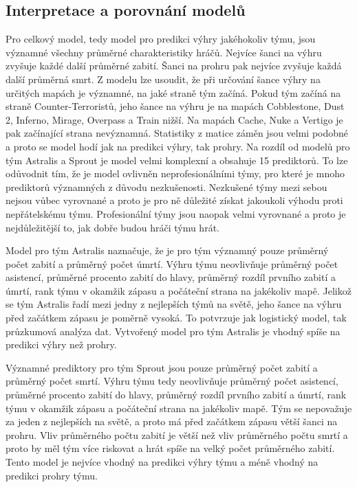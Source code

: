 \subsection{Interpretace a porovnání modelů}
Pro celkový model, tedy model pro predikci výhry jakéhokoliv týmu, jsou významné všechny průměrné charakteristiky hráčů. Nejvíce šanci na výhru zvyšuje každé
další průměrné zabití. Šanci na prohru pak nejvíce zvyšuje každá další průměrná smrt. Z modelu lze usoudit, že při určování šance výhry na určitých mapách je významné, na jaké 
straně tým začíná. Pokud tým začíná na straně Counter-Terroristů, jeho šance na výhru je na mapách Cobblestone, Dust 2,
Inferno, Mirage, Overpass a Train nižší. Na mapách Cache, Nuke a Vertigo je pak začínající strana nevýznamná. Statistiky z matice záměn jsou velmi podobné a proto se model hodí 
jak na predikci výhry, tak prohry. Na rozdíl od modelů pro tým Astralis a Sprout je model velmi komplexní a obsahuje 15 prediktorů. To lze odůvodnit tím, že je model 
ovlivněn neprofesionálními týmy, pro které je mnoho prediktorů významných z důvodu nezkušenosti. Nezkušené týmy mezi sebou nejsou vůbec vyrovnané a proto je pro ně důležité 
získat jakoukoli výhodu proti nepřátelskému týmu. Profesionální týmy jsou naopak velmi vyrovnané a proto je nejdůležitější to, jak dobře budou hráči týmu hrát. 

Model pro tým Astralis naznačuje, že je pro tým významný pouze průměrný počet zabití a průměrný počet úmrtí. Výhru týmu neovlivňuje průměrný počet asistencí, průměrné
procento zabití do hlavy, průměrný rozdíl prvního zabití a úmrtí, rank týmu v okamžik zápasu a počáteční strana na jakékoliv mapě. Jelikož se tým Astralis řadí mezi jedny z 
nejlepších týmů na  světě, jeho šance na výhru před začátkem zápasu je poměrně vysoká. To potvrzuje jak logistický model, tak průzkumová analýza dat. Vytvořený model pro tým Astralis je vhodný
spíše na predikci výhry než prohry. 

Významné prediktory pro tým Sprout jsou pouze průměrný počet zabití a průměrný počet smrtí. Výhru týmu tedy neovlivňuje průměrný počet asistencí, průměrné
procento zabití do hlavy, průměrný rozdíl prvního zabití a úmrtí, rank týmu v okamžik zápasu a počáteční strana na jakékoliv mapě. Tým se nepovažuje za jeden z nejlepších na světě,
a proto má před začátkem zápasu větší šanci na prohru. Vliv průměrného počtu zabití je větší než vliv průměrného počtu smrtí a proto by měl tým více riskovat a hrát spíše na velký
počet průměrného zabití. Tento model je nejvíce vhodný na predikci výhry týmu a méně vhodný na predikci prohry týmu.

